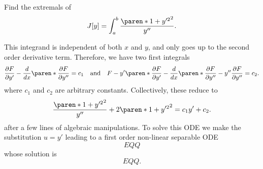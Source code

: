 \documentclass[11pt]{penrose}
\begin{document}
\begin{negg}
    Find the extremals of
    \begin{equation}
        J[y] = \int_a^b \frac{\paren*{1 + y'^2}^2}{y''}.
    \end{equation}

    This integrand is independent of both $x$ and $y$, and only goes up to the second order derivative term. Therefore, we have two first integrals
    \begin{equation}
        \frac{\pd F}{\pd y'} - \frac{d}{dx} \paren*{\frac{\pd F}{\pd y''}} = c_1
        \quad\text{and}\quad
        F - y' \paren*{\frac{\pd F}{\pd y'} - \frac{d}{dx}\paren*{\frac{\pd F}{\pd y''}}} - y'' \frac{\pd F}{\pd y''} = c_2.
    \end{equation}
    where $c_1$ and $c_2$ are arbitrary constants. Collectively, these reduce to
    \begin{equation}
        \frac{\paren*{1 + y'^2}^2}{y''} + 2 \paren*{1 + y'^2}^2 = c_1 y' + c_2.
    \end{equation}
    after a few lines of algebraic manipulations. To solve this ODE we make the substitution $u = y'$ leading to a first order non-linear separable ODE
    \begin{equation}
        EQQ
    \end{equation}
    whose solution is
    \begin{equation}
        EQQ.
    \end{equation}

\end{negg}

\end{document}
